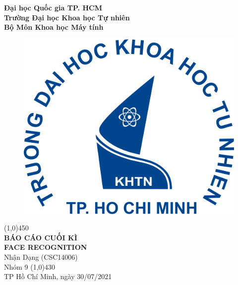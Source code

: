 \documentclass[a4paper, 12pt]{article}
\begin{document}
\begin{titlepage}
    \begin{center}
        \Large\textbf{Đại học Quốc gia TP. HCM\\Trường Đại học Khoa học Tự nhiên\\Bộ Môn Khoa học Máy tính}\\

        \vspace*{1cm}
        \begin{figure}[H]
            \begin{center}
                \includegraphics[scale=0.2]{images/hcmus-logo}
            \end{center}
        \end{figure}
        \line(1,0){450}\\[4mm]
        \LARGE\textbf{\MakeUppercase{Báo cáo Cuối kì\\ Face Recognition}}\\[3mm]
        \Large{Nhận Dạng (CSC14006)}\\[3mm]
        \Large{Nhóm 9}
        \line(1,0){430}\\

        \vfill
        TP Hồ Chí Minh, ngày 30/07/2021
    \end{center}
\end{titlepage}

\tableofcontents
\thispagestyle{empty}
\clearpage
\end{document}
